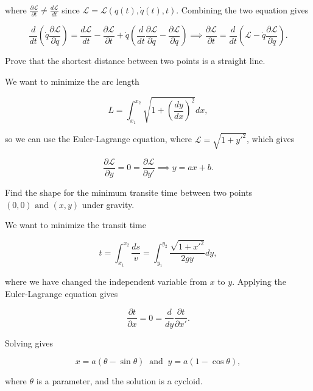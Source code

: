 \documentclass[a4paper,12pt]{report}
\begin{document}
where \(\frac{\partial \mathcal{L}}{\partial t} \neq \frac{d \mathcal{L}}{dt}  \) since \(\mathcal{L} = \mathcal{L}(q(t), \dot{q} (t),t)\). Combining the two equation gives 

\begin{equation}
	\frac{d}{dt} \left( \dot{q} \frac{\partial \mathcal{L}}{\partial \dot{q} }  \right) = \frac{d \mathcal{L}}{dt} - \frac{\partial \mathcal{L}}{\partial t} + \dot{q} \left( \frac{d}{dt} \frac{\partial \mathcal{L}}{\partial \dot{q} }  - \frac{\partial \mathcal{L}}{\partial q} \right) \implies \frac{\partial \mathcal{L}}{\partial t} = \frac{d}{dt} \left( \mathcal{L} - \dot{q} \frac{\partial \mathcal{L}}{\partial \dot{q} } \right).
\end{equation}





{Prove that the shortest distance between two points is a straight line.}
{We want to minimize the arc length 

\begin{equation}
	L = \int_{x_1 }^{x_2 } \sqrt{1+ \left( \frac{dy}{dx}  \right)^2} dx,   
\end{equation}

so we can use the Euler-Lagrange equation, where \(\mathcal{L} = \sqrt{1+y'^2} \), which gives 

\begin{equation}
	\frac{\partial \mathcal{L}}{\partial y} = 0 = \frac{\partial \mathcal{L}}{\partial y'} \implies y = ax+b.
\end{equation}

} 

{Find the shape for the minimum transite time between two points \((0,0) \text { and } (x ,y )\) under gravity. }
{We want to minimize the transit time 

\begin{equation}
	t = \int_{x_1 }^{x_2 } \frac{ds}{v} = \int_{y_1 }^{y_2 } \frac{\sqrt{1+x'^2} }{2gy} dy,      
\end{equation}

where we have changed the independent variable from \(x\) to \(y\). Applying the Euler-Lagrange equation gives 

\begin{equation}
	\frac{\partial t}{\partial x} = 0 = \frac{d}{dy} \frac{\partial t}{\partial x' }.   
\end{equation}

Solving gives 

\begin{equation}
	x = a(\theta -\sin \theta ) ~\text { and }~ y = a(1-\cos \theta ), 
\end{equation}

where \(\theta \) is a parameter, and the solution is a cycloid. 
} 
\end{document}
